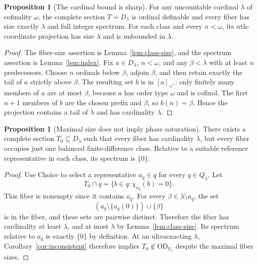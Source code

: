 \documentclass[11pt,letterpaper]{article}
\theoremstyle{definition}
\newtheorem{proposition}[definition]{Proposition}
\newcommand{\OD}{\mathrm{OD}}
\numberwithin{equation}{section}
\newcommand{\ch}{\chi}
\begin{document}
\begin{proposition}[The cardinal bound is sharp]\label{prop:full-control}
For any uncountable cardinal $\lambda$ of cofinality $\omega$, the complete section $T=D_\lambda$ is ordinal definable and every fiber has size exactly $\lambda$ and full integer spectrum. For each class and every $n<\omega$, its $n$th-coordinate projection has size $\lambda$ and is unbounded in $\lambda$.
\end{proposition}
\begin{proof}
The fiber-size assertion is Lemma~\ref{lem:class-size}, and the spectrum assertion is Lemma~\ref{lem:index}. Fix $a\in D_\lambda$, $n<\omega$, and any $\beta<\lambda$ with at least $n$ predecessors. Choose $n$ ordinals below $\beta$, adjoin $\beta$, and then retain exactly the tail of $a$ strictly above $\beta$. The resulting set $b$ is in $[a]_{=^{*}}$: only finitely many members of $a$ are at most $\beta$, because $a$ has order type $\omega$ and is cofinal. The first $n+1$ members of $b$ are the chosen prefix and $\beta$, so $b(n)=\beta$. Hence the projection contains a tail of $\lambda$ and has cardinality $\lambda$.
\end{proof}

\begin{proposition}[Maximal size does not imply phase saturation]\label{prop:balanced-control}
There exists a complete section $T_0\subseteq D_\lambda$ such that every fiber has cardinality $\lambda$, but every fiber occupies just one balanced finite-difference class. Relative to a suitable reference representative in each class, its spectrum is $\{0\}$.
\end{proposition}
\begin{proof}
Use Choice to select a representative $a_q\in q$ for every $q\in Q_\lambda$. Let
\[
T_0\cap q=\{b\in q:\ch_{a_q}(b)=0\}.
\]
This fiber is nonempty since it contains $a_q$. For every $\beta\in\lambda\setminus a_q$, the set
\[
(a_q\setminus\{a_q(0)\})\cup\{\beta\}
\]
is in the fiber, and these sets are pairwise distinct. Therefore the fiber has cardinality at least $\lambda$, and at most $\lambda$ by Lemma~\ref{lem:class-size}. Its spectrum relative to $a_q$ is exactly $\{0\}$ by definition. At an ultraexacting $\lambda$, Corollary~\ref{cor:inconsistent} therefore implies $T_0\notin\OD_{V_\lambda}$ despite the maximal fiber sizes.
\end{proof}
\end{document}
